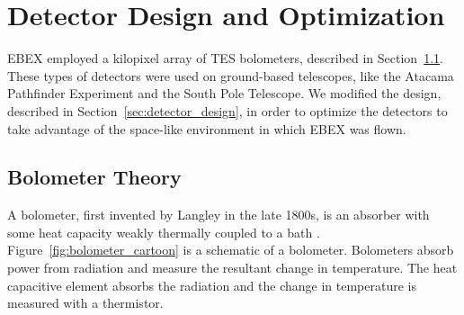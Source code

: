 \chapter{Detector Design and Optimization}
\label{sec:optimization_chapter}

\ac{EBEX} employed a kilopixel array of \ac{TES} bolometers, described in Section~\ref{sec:tes_bolometer}. 
These types of detectors were used on ground-based telescopes, like the Atacama Pathfinder Experiment and the South Pole Telescope. 
We modified the design, described in Section~\ref{sec:detector_design}, in order to optimize the detectors to take advantage of the space-like environment in which \ac{EBEX} was flown.


\section{Bolometer Theory}
\label{sec:tes_bolometer}




A bolometer, first invented by Langley in the late 1800s, is an absorber with some heat capacity weakly thermally coupled to a bath \cite{langley}.
Figure~\ref{fig:bolometer_cartoon} is a schematic of a bolometer. 
Bolometers absorb power from radiation and measure the resultant change in temperature. 
The heat capacitive element absorbs the radiation and the change in temperature is measured with a thermistor. 

